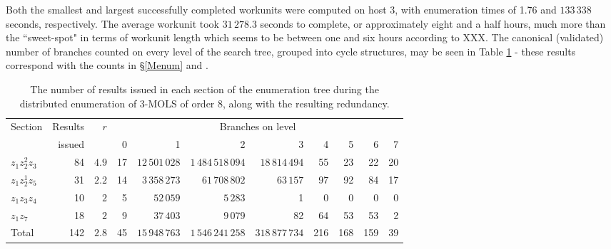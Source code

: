 Both the smallest and largest successfully completed workunits were computed on host 3, with enumeration times of 1.76 and $133\,338$ seconds, respectively. The average workunit took $31\,278.3$ seconds to complete, or approximately eight and a half hours, much more than the ``sweet-spot" in terms of workunit length which seems to be between one and six hours according to XXX. The canonical (validated) number of branches counted on every level of the search tree, grouped into cycle structures,  may be seen in  Table \ref{83naivebranches} - these results correspond with  the counts in \S\ref{Menum} and \cite[p. 114]{Kidd2012}.  
  \begin{table}[htb]
 \centering
 \caption{The number of results issued in each section of the enumeration tree during the distributed enumeration of 3-MOLS of order 8, along with the resulting redundancy.}
\begin{tabular}{lrrrrrrrrrr}
\toprule
Section & Results  & $r$& \multicolumn{8}{c}{Branches on level} \\
\cmidrule(lr){4-11}
 &issued & & 0 & 1 & 2 & 3 & 4 & 5 & 6 & 7     \\ \midrule 
$z_1z_2^2z_3$ & 84 &$4.9$ &17 & $12\,501\,028$ & $1\,484\,518\,094$ & $18\,814\,494$ & 55 & 23 & 22 & 20  \\ 
$z_1z_2^1z_5$ &31 &$2.2$ &14 & $3\,358\,273$ & $61\,708\,802$ & $63\,157$ & 97 & 92 & 84 & 17   \\ 
$z_1z_3z_4$& 10& $2$ &5 & $52\,059$ & $5\,283$ & 1 & 0 & 0 & 0 & 0   \\ 
$z_1z_7$ & 18&$2$ &9 & $37\,403$ & $9\,079$ & 82 & 64 & 53 & 53 & 2   \\ \midrule
Total &142 &$2.8$&45 & $15\,948\,763$ & $1\,546\,241\,258$ & $318\,877\,734$ & 216 & 168 & 159 & 39  \\ \bottomrule
\end{tabular}\vspace*{.4cm}
\label{83naivebranches}
\end{table}




